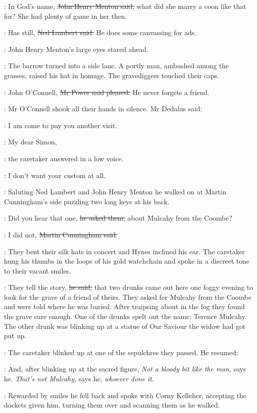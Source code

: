 \menton:
In God's name,
\sout{John Henry Menton said,}
what did she marry a coon like that for?
She had plenty of game in her then.

\lambert:
Has still,
\sout{Ned Lambert said.}
He does some canvassing for ads.

:
John Henry Menton's large eyes stared ahead.

:
The barrow turned into a side lane.
A portly man, ambushed among the grasses, raised his hat in homage.
The gravediggers touched their caps.

\power:
John O'Connell,
\sout{Mr Power said pleased.}
He never forgets a friend.

:
Mr O'Connell shook all their hands in silence.
Mr Dedalus said:

\simon:
I am come to pay you another visit.

\oconnell:
My dear Simon,

:
the caretaker answered in a low voice.

\oconnell:
I don't want your custom at all.

:
Saluting Ned Lambert and John Henry Menton
he walked on at Martin Cunningham's side
puzzling two long keys at his back.

\oconnell:
Did you hear that one,
\sout{he asked them,}
about Mulcahy from the Coombe?

\cunningham:
I did not,
\sout{Martin Cunningham said.}

:
They bent their silk hats in concert and Hynes inclined his ear.
The caretaker hung his thumbs in the loops of his gold watchchain
and spoke in a discreet tone to their vacant smiles.

\oconnell:
They tell the story,
\sout{he said,}
that two drunks came out here one foggy evening
to look for the grave of a friend of theirs.
They asked for Mulcahy from the Coombe and were told where he was buried.
After traipsing about in the fog they found the grave sure enough.
One of the drunks spelt out the name:
Terence Mulcahy.
The other drunk was blinking up at a statue of Our Saviour
the widow had got put up.

:
The caretaker blinked up at one of the sepulchres they passed.
He resumed:

\oconnell:
And, after blinking up at the sacred figure,
\emph{Not a bloody bit like the man,} says he.
\emph{That's not Mulcahy,} says he,
\emph{whoever done it.}

:
Rewarded by smiles
he fell back and spoke with Corny Kelleher,
accepting the dockets given him,
turning them over and scanning them as he walked.

